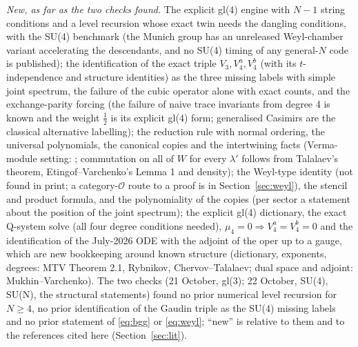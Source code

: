 \documentclass[11pt]{article}
\makeatletter
\renewcommand\subsection{\@startsection{subsection}{2}{\z@}{-2.0ex \@plus -1ex \@minus -.2ex}{0.6ex \@plus .2ex}{\normalfont\normalsize\bfseries}}
\makeatother
\begin{document}
\emph{New, as far as the two checks found.}
The explicit gl(4) engine with $N-1$ string conditions and a level recursion whose exact twin needs the dangling conditions, with the SU(4) benchmark (the Munich group has an unreleased Weyl-chamber variant accelerating the descendants, and no SU(4) timing of any general-$N$ code is published);
the identification of the exact triple $V_3,V_4^a,V_4^b$ (with its $t$-independence and structure identities) as the three missing labels with simple joint spectrum, the failure of the cubic operator alone with exact counts, and the exchange-parity forcing (the failure of naive trace invariants from degree 4 is known and the weight $\tfrac12$ is its explicit gl(4) form; generalised Casimirs are the classical alternative labelling);
the reduction rule with normal ordering, the universal polynomials, the canonical copies and the intertwining facts (Verma-module setting: \cite{ev,stv,mudrov}; commutation on all of $W$ for every $\lambda'$ follows from Talalaev's theorem, Etingof--Varchenko's Lemma 1 and density);
the Weyl-type identity (not found in print; a category-$\mathcal O$ route to a proof is in Section~\ref{sec:weyl}), the stencil and product formula, and the polynomiality of the copies (per sector a statement about the position of the joint spectrum);
the explicit gl(4) dictionary, the exact Q-system solve (all four degree conditions needed), $\mu_4=0\Rightarrow V_4^a=V_4^b=0$ and the identification of the July-2026 ODE with the adjoint of the oper up to a gauge, which are new bookkeeping around known structure (dictionary, exponents, degrees: MTV Theorem 2.1, Rybnikov, Chervov--Talalaev; dual space and adjoint: Mukhin--Varchenko).
The two checks (21 October, gl(3); 22 October, SU(4), SU(N), the structural statements) found no prior numerical level recursion for $N\ge4$, no prior identification of the Gaudin triple as the SU(4) missing labels and no prior statement of \eqref{eq:bgg} or \eqref{eq:weyl}; ``new'' is relative to them and to the references cited here (Section~\ref{sec:lit}).

\subsection{Next}\label{sec:next}
\end{document}
